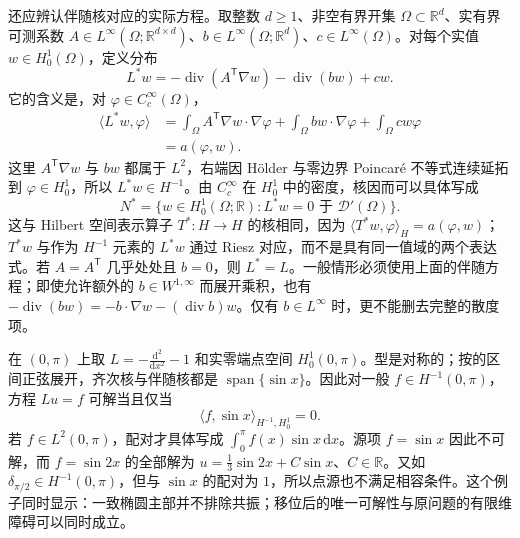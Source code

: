 \ProseParagraphBreak

还应辨认伴随核对应的实际方程。取整数 \(d\geq1\)、非空有界开集 \(\Omega\subset\mathbb R^d\)、实有界可测系数 \(A\in L^\infty(\Omega;\mathbb R^{d\times d})\)、\(b\in L^\infty(\Omega;\mathbb R^d)\)、\(c\in L^\infty(\Omega)\)。对每个实值 \(w\in H_0^1(\Omega)\)，定义分布
\[
 L^*w=-\operatorname{div}(A^{\mathsf T}\nabla w)
          -\operatorname{div}(bw)+cw.
\]
它的含义是，对 \(\varphi\in C_c^\infty(\Omega)\)，
\[
 \begin{aligned}
 \langle L^*w,\varphi\rangle
 &=\int_\Omega A^{\mathsf T}\nabla w\cdot\nabla\varphi
       +\int_\Omega bw\cdot\nabla\varphi+\int_\Omega cw\varphi\\
 &=a(\varphi,w).
 \end{aligned}
\]
这里 \(A^{\mathsf T}\nabla w\) 与 \(bw\) 都属于 \(L^2\)，右端因 Hölder 与零边界 Poincaré 不等式连续延拓到 \(\varphi\in H_0^1\)，所以 \(L^*w\in H^{-1}\)。由 \(C_c^\infty\) 在 \(H_0^1\) 中的密度，核因而可以具体写成
\[
 N^*=\{w\in H_0^1(\Omega;\mathbb R):L^*w=0\text{ 于 }\mathcal D'(\Omega)\}.
\]
这与 Hilbert 空间表示算子 \(T^*:H\to H\) 的核相同，因为 \(\langle T^*w,\varphi\rangle_H=a(\varphi,w)\)；\(T^*w\) 与作为 \(H^{-1}\) 元素的 \(L^*w\) 通过 Riesz 对应，而不是具有同一值域的两个表达式。若 \(A=A^{\mathsf T}\) 几乎处处且 \(b=0\)，则 \(L^*=L\)。一般情形必须使用上面的伴随方程；即使允许额外的 \(b\in W^{1,\infty}\) 而展开乘积，也有
\(-\operatorname{div}(bw)=-b\cdot\nabla w-(\operatorname{div}b)w\)。仅有 \(b\in L^\infty\) 时，更不能删去完整的散度项。

\ProseParagraphBreak

在 \((0,\pi)\) 上取 \(L=-\frac{\mathrm d^2}{\mathrm dx^2}-1\) 和实零端点空间 \(H_0^1(0,\pi)\)。型是对称的；按的区间正弦展开，齐次核与伴随核都是 \(\operatorname{span}\{\sin x\}\)。因此对一般 \(f\in H^{-1}(0,\pi)\)，方程 \(Lu=f\) 可解当且仅当
\[
 \langle f,\sin x\rangle_{H^{-1},H_0^1}=0.
\]
若 \(f\in L^2(0,\pi)\)，配对才具体写成 \(\int_0^\pi f(x)\sin x\,\mathrm dx\)。源项 \(f=\sin x\) 因此不可解，而 \(f=\sin2x\) 的全部解为 \(u=\tfrac13\sin2x+C\sin x\)、\(C\in\mathbb R\)。又如 \(\delta_{\pi/2}\in H^{-1}(0,\pi)\)，但与 \(\sin x\) 的配对为 \(1\)，所以点源也不满足相容条件。这个例子同时显示：一致椭圆主部并不排除共振；移位后的唯一可解性与原问题的有限维障碍可以同时成立。


